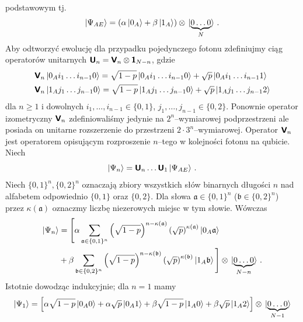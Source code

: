 \documentclass{myclass}
\begin{document}
podstawowym tj.
\begin{equation*}
    \ket{\Psi_{AE}} = (\alpha\ket{0_A} + \beta\ket{1_A}) \otimes \ket*{\underbrace{0\ldots0}_N}\,.
\end{equation*}
Aby odtworzyć ewolucję dla przypadku pojedynczego fotonu zdefiniujmy ciąg operatorów unitarnych
\(\boldsymbol{\mathsf{U}}_n = \boldsymbol{\mathsf{V}}_n \otimes \boldsymbol{\mathsf{1}}_{N-n}\), gdzie
\begin{equation*}
    \begin{split}
        &\boldsymbol{\mathsf{V}}_n\ket{0_Ai_1\ldots i_{n-1}0} = \sqrt{1-p}\ket{0_Ai_1\ldots i_{n-1}0} + \sqrt{p}\ket{0_Ai_1\ldots i_{n-1}1}\\
        &\boldsymbol{\mathsf{V}}_n\ket{1_Aj_1\ldots j_{n-1}0} = \sqrt{1-p}\ket{1_Aj_1\ldots j_{n-1}0} + \sqrt{p}\ket{1_Aj_1\ldots j_{n-1}2}
    \end{split}
\end{equation*}
dla \(n \geq 1\) i dowolnych \(i_1,\ldots,i_{n-1} \in \{0,1\}\), \(j_1,\ldots,j_{n-1} \in \{0,2\}\).
Ponownie operator izometryczny \(\boldsymbol{\mathsf{V}}_n\) zdefiniowaliśmy jedynie na \(2^n\)--wymiarowej
podprzestrzeni ale posiada on unitarne rozszerzenie do przestrzeni \(2\cdot 3^n\)--wymiarowej.
Operator \(\boldsymbol{\mathsf{V}}_n\) jest operatorem opisującym rozproszenie \(n\)--tego w kolejności fotonu na
qubicie. Niech 
\begin{equation*}
    \ket{\Psi_n} = \boldsymbol{\mathsf{U}}_n\ldots\boldsymbol{\mathsf{U}}_1\ket{\Psi_{AE}}\,.
\end{equation*}
Niech \(\{0,1\}^n, \{0,2\}^n\) oznaczają zbiory wszystkich słów binarnych długości \(n\) nad
alfabetem odpowiednio \(\{0,1\}\) oraz \(\{0,2\}\). Dla słowa \(\mathfrak{a} \in \{0,1\}^n\)
(\(\mathfrak{b} \in \{0,2\}^n\)) przez \(\kappa(\mathfrak{a})\) oznaczmy liczbę niezerowych miejsc w
tym słowie. Wówczas
\begin{equation*}
    \begin{split}
        \ket{\Psi_n} &= \Bigg[\alpha\sum_{\mathfrak{a}\in\{0,1\}^n}\left(\sqrt{1-p}\right)^{n-\kappa(\mathfrak{a})}\left(\sqrt{p}\right)^{\kappa(\mathfrak{a})}\ket{0_A\mathfrak{a}} \\
        &+ \beta\sum_{\mathfrak{b}\in\{0,2\}^n}\left(\sqrt{1-p}\right)^{n-\kappa(\mathfrak{b})}\left(\sqrt{p}\right)^{\kappa(\mathfrak{b})}\ket{1_A\mathfrak{b}} \Bigg] \otimes \ket*{\underbrace{0\ldots 0}_{N-n}}\,.
    \end{split}
\end{equation*}
Istotnie dowodząc indukcyjnie; dla \(n=1\) mamy
\begin{equation*}
    \ket{\Psi_1} = \left[\alpha\sqrt{1-p}\ket{0_A0} + \alpha\sqrt{p}\ket{0_A1} + \beta\sqrt{1-p}\ket{1_A0} + \beta\sqrt{p}\ket{1_A2}\right]\otimes \ket*{\underbrace{0\ldots 0}_{N-1}}
\end{equation*}
\end{document}
